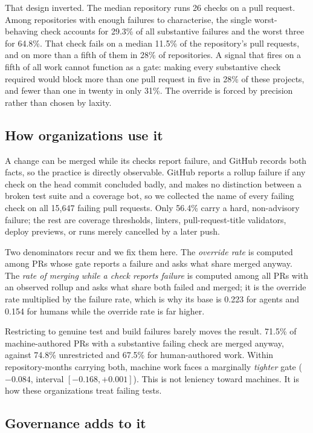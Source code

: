 \documentclass[mnsc]{informs4}
\begin{document}
That design inverted. The median repository runs 26 checks on a pull request. Among repositories with enough failures to characterise, the single worst-behaving
check accounts for 29.3\% of all substantive failures and the worst three for
64.8\%. That check fails on a median 11.5\% of the repository's pull requests, and
on more than a fifth of them in 28\% of repositories. A signal that fires on a
fifth of all work cannot function as a gate: making every substantive check
required would block more than one pull request in five in 28\% of these projects,
and fewer than one in twenty in only 31\%. The override is forced by precision
rather than chosen by laxity.

\subsection{How organizations use it}

A change can be merged while its checks report failure, and GitHub records both
facts, so the practice is directly observable. GitHub
reports a rollup failure if any check on the head commit concluded badly, and makes
no distinction between a broken test suite and a coverage bot, so we collected the
name of every failing check on all 15,647 failing pull requests. Only 56.4\% carry
a hard, non-advisory failure; the rest are coverage thresholds, linters,
pull-request-title validators, deploy previews, or runs merely cancelled by a later
push.

Two denominators recur and we fix them here. The \emph{override rate} is computed
among PRs whose gate reports a failure and asks what share merged anyway. The
\emph{rate of merging while a check reports failure} is computed among all PRs with an observed rollup and asks what
share both failed and merged; it is the override rate multiplied by the failure
rate, which is why its base is 0.223 for agents and 0.154 for humans while the
override rate is far higher.

Restricting to genuine test and build failures barely moves the result. 71.5\% of machine-authored PRs with a substantive failing check are merged
anyway, against 74.8\% unrestricted and 67.5\% for human-authored work. Within
repository-months carrying both, machine work faces a marginally \emph{tighter}
gate ($-0.084$, interval $[-0.168, +0.001]$). This is not leniency toward machines. It is how these organizations treat failing tests.

\subsection{Governance adds to it}
\end{document}

